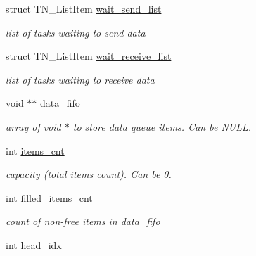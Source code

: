 \begin{DoxyCompactItemize}
\item 
\hypertarget{structTN__DQueue_a5094327a117b22df9d3b09ee45204c62}{struct T\+N\+\_\+\+List\+Item \hyperlink{structTN__DQueue_a5094327a117b22df9d3b09ee45204c62}{wait\+\_\+send\+\_\+list}}\label{structTN__DQueue_a5094327a117b22df9d3b09ee45204c62}

\begin{DoxyCompactList}\small\item\em list of tasks waiting to send data \end{DoxyCompactList}\item 
\hypertarget{structTN__DQueue_a2cb2cfdd31937d5d121a72b4e2ee6f1b}{struct T\+N\+\_\+\+List\+Item \hyperlink{structTN__DQueue_a2cb2cfdd31937d5d121a72b4e2ee6f1b}{wait\+\_\+receive\+\_\+list}}\label{structTN__DQueue_a2cb2cfdd31937d5d121a72b4e2ee6f1b}

\begin{DoxyCompactList}\small\item\em list of tasks waiting to receive data \end{DoxyCompactList}\item 
\hypertarget{structTN__DQueue_aba382885049d3df6ed8dbb8736ced1ad}{void $\ast$$\ast$ \hyperlink{structTN__DQueue_aba382885049d3df6ed8dbb8736ced1ad}{data\+\_\+fifo}}\label{structTN__DQueue_aba382885049d3df6ed8dbb8736ced1ad}

\begin{DoxyCompactList}\small\item\em array of {\ttfamily void $\ast$} to store data queue items. Can be {\ttfamily N\+U\+L\+L}. \end{DoxyCompactList}\item 
\hypertarget{structTN__DQueue_a1c0167117cef4412bbbac2aff3334e7b}{int \hyperlink{structTN__DQueue_a1c0167117cef4412bbbac2aff3334e7b}{items\+\_\+cnt}}\label{structTN__DQueue_a1c0167117cef4412bbbac2aff3334e7b}

\begin{DoxyCompactList}\small\item\em capacity (total items count). Can be 0. \end{DoxyCompactList}\item 
\hypertarget{structTN__DQueue_a536190a17aff0355de36d8d68aa7d98c}{int \hyperlink{structTN__DQueue_a536190a17aff0355de36d8d68aa7d98c}{filled\+\_\+items\+\_\+cnt}}\label{structTN__DQueue_a536190a17aff0355de36d8d68aa7d98c}

\begin{DoxyCompactList}\small\item\em count of non-\/free items in {\ttfamily data\+\_\+fifo} \end{DoxyCompactList}\item 
\hypertarget{structTN__DQueue_a3451096f72cc02a2bed5573c2457323e}{int \hyperlink{structTN__DQueue_a3451096f72cc02a2bed5573c2457323e}{head\+\_\+idx}}\label{structTN__DQueue_a3451096f72cc02a2bed5573c2457323e}


\end{DoxyCompactItemize}
